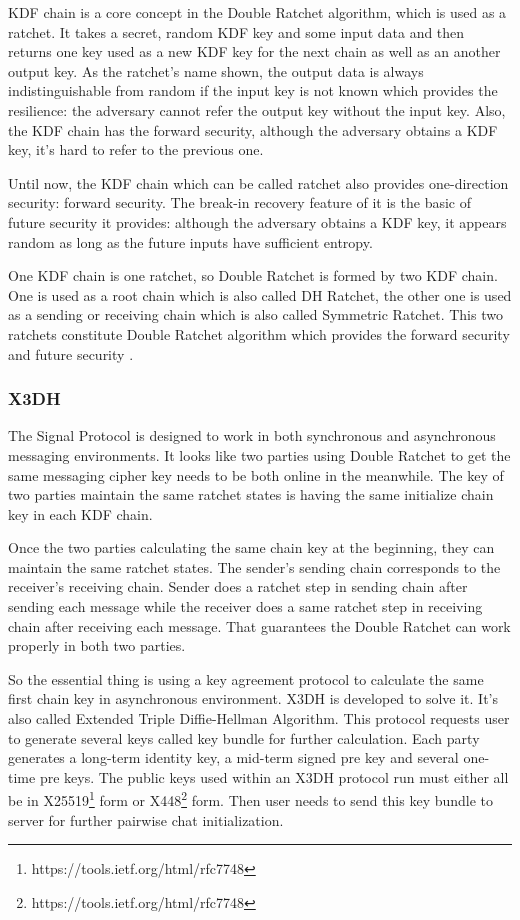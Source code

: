 KDF chain \citep{DR} is a core concept in the Double Ratchet algorithm, which is used as a ratchet. It takes a secret, random KDF key and some input data and then returns one key used as a new KDF key for the next chain as well as an another output key. As the ratchet's name shown, the output data is always indistinguishable from random if the input key is not known which provides the resilience: the adversary cannot refer the output key without the input key. Also, the KDF chain has the forward security, although the adversary obtains a KDF key, it's hard to refer to the previous one. 

Until now, the KDF chain which can be called ratchet also provides one-direction security: forward security. The break-in recovery feature of it is the basic of future security it provides: although the adversary obtains a KDF key, it appears random as long as the future inputs have sufficient entropy.

One KDF chain is one ratchet, so Double Ratchet is formed by two KDF chain. One is used as a root chain which is also called DH Ratchet, the other one is used as a sending or receiving chain which is also called Symmetric Ratchet. This two ratchets constitute Double Ratchet algorithm which provides the forward security and future security \citep{DR}.

\subsubsection{X3DH}
The Signal Protocol is designed to work in both synchronous and asynchronous messaging environments. It looks like two parties using Double Ratchet to get the same messaging cipher key needs to be both online in the meanwhile. The key of two parties maintain the same ratchet states is having the same initialize chain key in each KDF chain.

Once the two parties calculating the same chain key at the beginning, they can maintain the same ratchet states. The sender's sending chain corresponds to the receiver's receiving chain. Sender does a ratchet step in sending chain after sending each message while the receiver does a same ratchet step in receiving chain after receiving each message. That guarantees the Double Ratchet can work properly in both two parties.

So the essential thing is using a key agreement protocol \citep{X3DH} to calculate the same first chain key in asynchronous environment. X3DH is developed to solve it. It's also called Extended Triple Diffie-Hellman Algorithm. This protocol requests user to generate several keys called key bundle for further calculation. Each party generates a long-term identity key, a mid-term signed pre key and several one-time pre keys. The public keys used within an X3DH protocol run must either all be in X25519\footnote{https://tools.ietf.org/html/rfc7748} form or X448\footnote{https://tools.ietf.org/html/rfc7748} form.
Then user needs to send this key bundle to server for further pairwise chat initialization.

